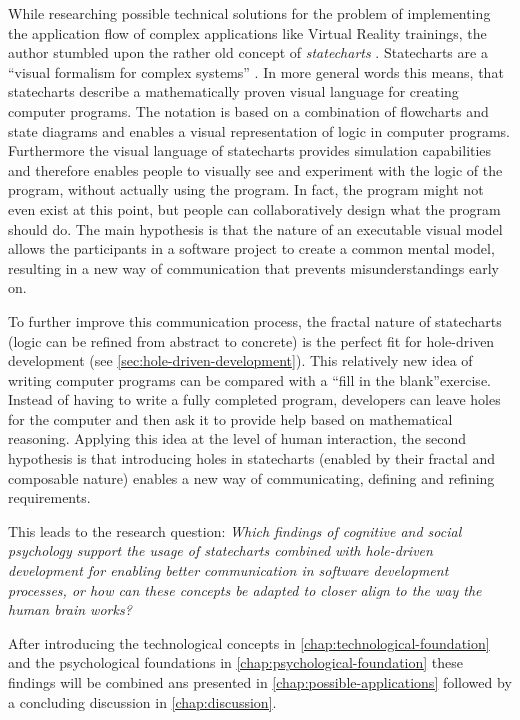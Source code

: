 While researching possible technical solutions for the problem of implementing the application flow of complex applications like Virtual Reality trainings, the author stumbled upon the rather old concept of \emph{statecharts} \autocite{harel_statecharts:_1987}. Statecharts are a ``visual formalism for complex systems'' \autocite{harel_statecharts:_1987}. In more general words this means, that statecharts describe a mathematically proven visual language for creating computer programs. The notation is based on a combination of flowcharts and state diagrams and enables a visual representation of logic in computer programs. Furthermore the visual language of statecharts provides simulation capabilities and therefore enables people to visually see and experiment with the logic of the program, without actually using the program. In fact, the program might not even exist at this point, but people can collaboratively design what the program should do. The main hypothesis is that the nature of an executable visual model allows the participants in a software project to create a common mental model, resulting in a new way of communication that prevents misunderstandings early on.

To further improve this communication process, the fractal nature of statecharts (logic can be refined from abstract to concrete) is the perfect fit for hole-driven development (see \cref{sec:hole-driven-development}). This relatively new idea of writing computer programs can be compared with a ``fill in the blank''exercise. Instead of having to write a fully completed program, developers can leave holes for the computer and then ask it to provide help based on mathematical reasoning. Applying this idea at the level of human interaction, the second hypothesis is that introducing holes in statecharts (enabled by their fractal and composable nature) enables a new way of communicating, defining and refining requirements.

This leads to the research question: \emph{Which findings of cognitive and social psychology support the usage of statecharts combined with hole-driven development for enabling better communication in software development processes, or how can these concepts be adapted to closer align to the way the human brain works?}

After introducing the technological concepts in \cref{chap:technological-foundation} and the psychological foundations in \cref{chap:psychological-foundation} these findings will be combined ans presented in \cref{chap:possible-applications} followed by a concluding discussion in \cref{chap:discussion}.

